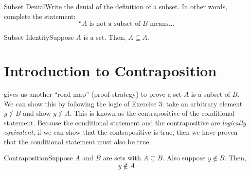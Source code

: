 \begin{exercise}
    {Subset Denial}Write the denial of the definition of a subset. In other words, complete the statement: \[\text{``}A \text{ is not a subset of \(B\) means...}\]
\end{exercise}



\begin{exercise}
    {Subset Identity}Suppose \(A\) is a set. Then, \(A\subseteq A\).
\end{exercise}




\section{Introduction to Contraposition}

 gives us another ``road map'' (proof strategy) to prove a set \(A\) is a subset of \(B\). We can show this by following the logic of Exercise 3: take an arbitrary element \(y \notin B\) and show \(y \notin A\). This is known as the contrapositive of the conditional statement. Because the conditional statement and the contrapositive are \textit{logically equivalent}, if we can show that the contrapositive is true, then we have proven that the conditional statement must also be true.

\begin{exercise}
    {Contraposition}Suppose \(A\) and \(B\) are sets with \(A\subseteq B\). Also suppose \(y\notin B\). Then, \[y\notin A\]
\end{exercise}


